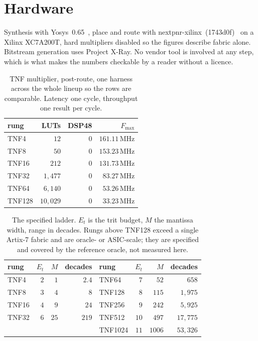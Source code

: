 \documentclass[11pt]{article}
\theoremstyle{definition}
\begin{document}
\section{Hardware}\label{sec:hardware}

Synthesis with Yosys~0.65~\cite{yosys}, place and route with
nextpnr-xilinx~(1743d0f)~\cite{nextpnr} on a
Xilinx XC7A200T, hard multipliers disabled so the figures describe fabric alone.
Bitstream generation uses Project X-Ray. No vendor tool is involved at any step,
which is what makes the numbers checkable by a reader without a licence.

\begin{table}[t]\centering
\caption{TNF multiplier, post-route, one harness across the whole lineup so the
rows are comparable. Latency one cycle, throughput one result per cycle.}
\label{tab:ladder}
\begin{tabular}{lrrr}
\toprule
rung & LUTs & DSP48 & $F_{\max}$ \\
\midrule
TNF4  & $12$      & $0$ & $161.11$\,MHz \\
TNF8  & $50$      & $0$ & $153.23$\,MHz \\
TNF16 & $212$     & $0$ & $131.73$\,MHz \\
TNF32  & $1{,}477$  & $0$ & $83.27$\,MHz \\
TNF64  & $6{,}140$  & $0$ & $53.26$\,MHz \\
TNF128 & $10{,}029$ & $0$ & $33.23$\,MHz \\
\bottomrule
\end{tabular}
\end{table}

\begin{table}[t]\centering
\caption{The specified ladder. $E_t$ is the trit budget, $M$ the mantissa width,
range in decades. Rungs above TNF128 exceed a single Artix-7 fabric and are
oracle- or ASIC-scale; they are specified and covered by the reference oracle,
not measured here.}
\label{tab:spec}
\begin{tabular}{lrrr@{\hskip 2em}lrrr}
\toprule
rung & $E_t$ & $M$ & decades & rung & $E_t$ & $M$ & decades \\
\midrule
TNF4  & $2$ & $1$  & $2.4$ & TNF64   & $7$  & $52$   & $658$ \\
TNF8  & $3$ & $4$  & $8$   & TNF128  & $8$  & $115$  & $1{,}975$ \\
TNF16 & $4$ & $9$  & $24$  & TNF256  & $9$  & $242$  & $5{,}925$ \\
TNF32 & $6$ & $25$ & $219$ & TNF512  & $10$ & $497$  & $17{,}775$ \\
       &     &      &       & TNF1024 & $11$ & $1006$ & $53{,}326$ \\
\bottomrule
\end{tabular}
\end{table}
\end{document}

